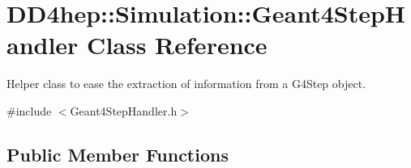 \hypertarget{class_d_d4hep_1_1_simulation_1_1_geant4_step_handler}{}\section{D\+D4hep\+:\+:Simulation\+:\+:Geant4\+Step\+Handler Class Reference}
\label{class_d_d4hep_1_1_simulation_1_1_geant4_step_handler}


Helper class to ease the extraction of information from a G4\+Step object.  




{\ttfamily \#include $<$Geant4\+Step\+Handler.\+h$>$}

\subsection*{Public Member Functions}
